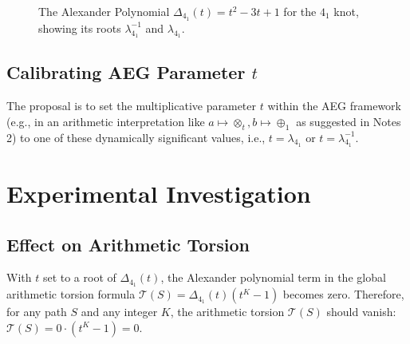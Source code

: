 \documentclass{article}
\begin{document}
\begin{figure}[h!]
    \centering
    \caption{The Alexander Polynomial $\Delta_{4_1}(t) = t^2 - 3t + 1$ for the $4_1$ knot, showing its roots $\lambda_{4_1}^{-1}$ and $\lambda_{4_1}$.}
    \label{fig:alex_poly_41}
\end{figure}


\subsection{Calibrating AEG Parameter $t$}
The proposal is to set the multiplicative parameter $t$ within the AEG framework (e.g., in an arithmetic interpretation like $a \mapsto \otimes_t, b \mapsto \oplus_1$ as suggested in Notes 2) to one of these dynamically significant values, i.e., $t = \lambda_{4_1}$ or $t = \lambda_{4_1}^{-1}$.

\section{Experimental Investigation}

\subsection{Effect on Arithmetic Torsion}
With $t$ set to a root of $\Delta_{4_1}(t)$, the Alexander polynomial term in the global arithmetic torsion formula $\mathcal{T}(S) = \Delta_{4_1}(t)(t^K-1)$ becomes zero. Therefore, for any path $S$ and any integer $K$, the arithmetic torsion $\mathcal{T}(S)$ should vanish: $\mathcal{T}(S) = 0 \cdot (t^K-1) = 0$.
\end{document}

